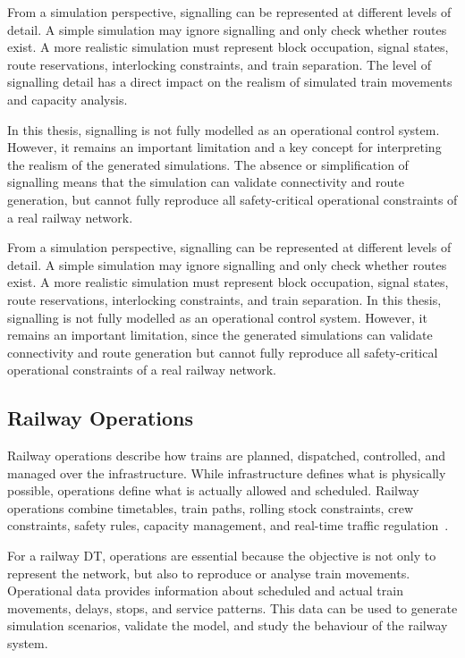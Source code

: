 From a simulation perspective, signalling can be represented at different levels of detail. A simple simulation may ignore 
signalling and only check whether routes exist. A more realistic simulation must represent block occupation, signal states, 
route reservations, interlocking constraints, and train separation. The level of signalling detail has a direct impact on 
the realism of simulated train movements and capacity analysis.

In this thesis, signalling is not fully modelled as an operational control system. However, it remains an important 
limitation and a key concept for interpreting the realism of the generated simulations. The absence or simplification 
of signalling means that the simulation can validate connectivity and route generation, but cannot fully reproduce all 
safety-critical operational constraints of a real railway network.

From a simulation perspective, signalling can be represented at different levels of detail. A simple simulation may 
ignore signalling and only check whether routes exist. A more realistic simulation must represent block occupation, signal 
states, route reservations, interlocking constraints, and train separation. In this thesis, signalling is not fully 
modelled as an operational control system. However, it remains an important limitation, since the generated simulations 
can validate connectivity and route generation but cannot fully reproduce all safety-critical operational constraints of 
a real railway network.

\subsection{Railway Operations}
Railway operations describe how trains are planned, dispatched, controlled, and managed over the infrastructure. While 
infrastructure defines what is physically possible, operations define what is actually allowed and scheduled. Railway 
operations combine timetables, train paths, rolling stock constraints, crew constraints, safety rules, capacity management, 
and real-time traffic regulation~\cite{pachl2018railway}.

For a railway DT, operations are essential because the objective is not only to represent the network, but also to 
reproduce or analyse train movements. Operational data provides information about scheduled and actual train movements, 
delays, stops, and service patterns. This data can be used to generate simulation scenarios, validate the model, and study 
the behaviour of the railway system.

